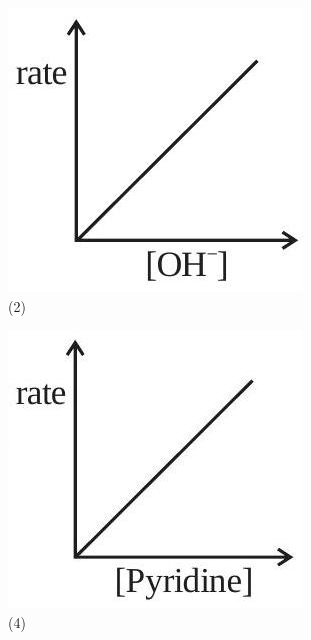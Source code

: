 \documentclass[10pt]{article}
\begin{document}
\begin{figure}[h]
\begin{center}
\captionsetup{labelformat=empty}
\caption{(2)}
  \includegraphics[width=\textwidth]{2025_10_02_a54bf82dc4585184bb5fg-1(4)}
\end{center}
\end{figure}

\begin{figure}[h]
\begin{center}
\captionsetup{labelformat=empty}
\caption{(4)}
  \includegraphics[width=\textwidth]{2025_10_02_a54bf82dc4585184bb5fg-1(1)}
\end{center}
\end{figure}
\end{document}
